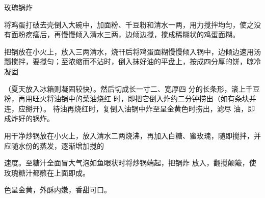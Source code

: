 \begin{recipe}{玫瑰锅炸}

\ingredients



\cooking

\step 将鸡蛋打破去壳倒入大碗中，加面粉、千豆粉和清水一两，用力搅拌均匀，使之没有面粉疙瘩后，再慢慢倾入清水三两，边倾边搅，搅成稀糊状的鸡蛋面糊。

\step 把锅放在小火上，放入三两清水，烧幵后将鸡蛋面糊慢慢倾入锅中，边倾边速用汤瓢搅拌，要搅匀；至浓缩而不沾时，倒入抹好油的平盘上，按成四分厚的饼，晾冷凝固

（夏天放入冰箱则凝固较快）。然后切成长一寸二、宽厚四 分的长条形，滚上千豆粉，再用旺火将油锅中的菜油烧红 时，即把它倒入炸约二分钟捞出（如有条块并连，应掰开）。 待油再烧红时，复倒入油锅中炸至呈金黄色时捞出，滤尽 油，即成炸好的锅炸。

\step 用干净炒锅放在小火上，放入清水二两烧沸，再加入白糖、蜜玫瑰，随即搅拌，并应随水份的蒸发，逐渐增加搅的

速度。至糖汁全面冒大气泡如鱼眼状时将炒锅端起，把锅炸 放入，翻搅颠簸，使玫瑰糖汁都蘸在上面即成。

\notes

色呈金黄，外酥内嫩，香甜可口。

\end{recipe}

